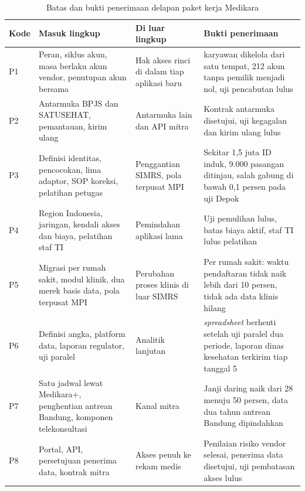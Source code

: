 \begin{table}[!htb]
  \centering
  \caption{Batas dan bukti penerimaan delapan paket kerja Medikara}
  \label{tab:ch11-batas-paket}
  \scriptsize
  \begin{tabularx}{\textwidth}{l>{\raggedright\arraybackslash}X>{\raggedright\arraybackslash}p{2.6cm}>{\raggedright\arraybackslash}X}
    \hline
    \textbf{Kode} & \textbf{Masuk lingkup} & \textbf{Di luar lingkup} & \textbf{Bukti penerimaan} \\ \hline
    P1 & Peran, siklus akun, masa berlaku akun vendor, penutupan akun bersama &
      Hak akses rinci di dalam tiap aplikasi baru &
      4.800 karyawan dikelola dari satu tempat, 212 akun tanpa pemilik menjadi nol, uji pencabutan lulus \\ \hline
    P2 & Antarmuka BPJS dan SATUSEHAT, pemantauan, kirim ulang &
      Antarmuka lain dan API mitra &
      Kontrak antarmuka disetujui, uji kegagalan dan kirim ulang lulus \\ \hline
    P3 & Definisi identitas, pencocokan, lima adaptor, SOP koreksi, pelatihan petugas &
      Penggantian SIMRS, pola terpusat MPI &
      Sekitar 1,5 juta ID induk, 9.000 pasangan ditinjau, salah gabung di bawah 0,1 persen pada uji Depok \\ \hline
    P4 & Region Indonesia, jaringan, kendali akses dan biaya, pelatihan staf TI &
      Pemindahan aplikasi lama &
      Uji pemulihan lulus, batas biaya aktif, staf TI lulus pelatihan \\ \hline
    P5 & Migrasi per rumah sakit, modul klinik, dua merek basis data, pola terpusat MPI &
      Perubahan proses klinis di luar SIMRS &
      Per rumah sakit: waktu pendaftaran tidak naik lebih dari 10 persen, tidak ada data klinis hilang \\ \hline
    P6 & Definisi angka, platform data, laporan regulator, uji paralel &
      Analitik lanjutan &
      23 \textit{spreadsheet} berhenti setelah uji paralel dua periode, laporan dinas kesehatan terkirim tiap tanggal 5 \\ \hline
    P7 & Satu jadwal lewat Medikara+, penghentian antrean Bandung, komponen telekonsultasi &
      Kanal mitra &
      Janji daring naik dari 28 menuju 50 persen, data dua tahun antrean Bandung dipindahkan \\ \hline
    P8 & Portal, API, persetujuan penerima data, kontrak mitra &
      Akses penuh ke rekam medis &
      Penilaian risiko vendor selesai, penerima data disetujui, uji pembatasan akses lulus \\ \hline
  \end{tabularx}
\end{table}

